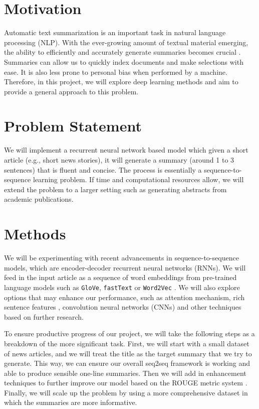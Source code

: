 \section{Motivation}
Automatic text summarization is an important task in natural language processing (NLP). With the ever-growing amount of textual material emerging, the ability to efficiently and accurately generate summaries becomes crucial \cite{gambhir2017recent}. Summaries can allow us to quickly index documents and make selections with ease. It is also less prone to personal bias when performed by a machine. Therefore, in this project, we will explore deep learning methods and aim to provide a general approach to this problem.

\section{Problem Statement}
We will implement a recurrent neural network based model which given a short article (e.g., short news stories), it will generate a summary (around 1 to 3 sentences) that is fluent and concise. The process is essentially a sequence-to-sequence learning problem. If time and computational resources allow, we will extend the problem to a larger setting such as generating abstracts from academic publications. 


\section{Methods}
We will be experimenting with recent advancements in sequence-to-sequence models, which are encoder-decoder recurrent neural networks (RNNs). We will feed in the input article as a sequence of word embeddings from pre-trained language models such as \texttt{GloVe}, \texttt{fastText} or \texttt{Word2Vec} \cite{pennington2014glove, bojanowski2017enriching, mikolov2013efficient}. We will also explore options that may enhance our performance, such as attention mechanism, rich sentence features \cite{nallapati2016abstractive}, convolution neural networks (CNNs) and other techniques based on further research. 

To ensure productive progress of our project, we will take the following steps as a breakdown of the more significant task. First, we will start with a small dataset of news articles, and we will treat the title as the target summary that we try to generate. This way, we can ensure our overall seq2seq framework is working and able to produce sensible one-line summaries. Then we will add in enhancement techniques to further improve our model based on the ROUGE metric system \cite{lin2004rouge}. Finally, we will scale up the problem by using a more comprehensive dataset in which the summaries are more informative. 

